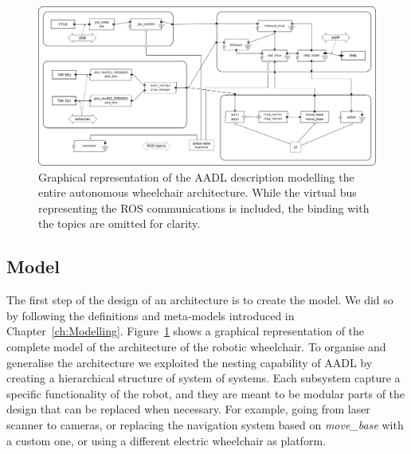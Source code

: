 \begin{landscape}
	\begin{figure}[t]
	\centering
	\includegraphics[width=0.95\textheight]{gfx/pmk/model}
	\caption[Graphical representation of the AADL description modelling the entire autonomous wheelchair architecture.]{Graphical representation of the AADL description modelling the entire autonomous wheelchair architecture. While the virtual bus representing the ROS communications is included, the binding with the topics are omitted for clarity.}
	\label{fig:pmk-model}
	\end{figure}
\end{landscape}


\subsection{Model}
\label{sec:pmk-model}
The first step of the design of an architecture is to create the model. We did so by following the definitions and meta-models introduced in Chapter~\ref{ch:Modelling}. Figure~\ref{fig:pmk-model} shows a graphical representation of the complete model of the architecture of the robotic wheelchair. To organise and generalise the architecture we exploited the nesting capability of AADL by creating a hierarchical structure of system of systems. Each subsystem capture a specific functionality of the robot, and they are meant to be modular parts of the design that can be replaced when necessary. For example, going from laser scanner to cameras, or replacing the navigation system based on \textit{move\_base} with a custom one, or using a different electric wheelchair as platform.


